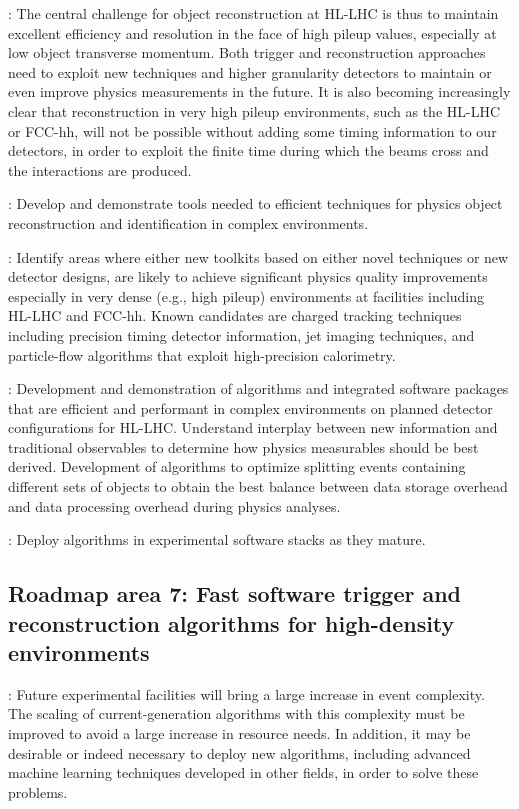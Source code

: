 : The central challenge for object reconstruction at HL-LHC is thus to maintain excellent efficiency and resolution in the face of high pileup values, especially at 
low object transverse momentum. Both trigger and reconstruction approaches need to exploit new techniques and higher granularity detectors to maintain or even improve physics measurements in the future.
It is also becoming increasingly clear that reconstruction in very high pileup environments, such as the HL-LHC or FCC-hh, will not be possible without adding some timing information to our 
detectors, in order to exploit the finite time during which the beams cross and the interactions are produced.

\vskip 0.5cm
: Develop and demonstrate tools needed to efficient techniques for physics object reconstruction and identification in complex environments.

\vskip 0.5cm
: Identify areas where either new toolkits based on either novel techniques or new detector designs, are likely to achieve significant physics quality 
improvements especially in very dense (e.g., high pileup) environments at facilities including HL-LHC and FCC-hh. Known candidates are charged tracking techniques including precision timing 
detector information, jet imaging techniques, and particle-flow algorithms that exploit high-precision calorimetry. 
 
\vskip 0.5cm
: Development and demonstration of algorithms and integrated software packages that are efficient and performant in complex environments on planned detector 
configurations for HL-LHC. Understand interplay between new information and traditional observables to determine how physics measurables should be best derived. Development of algorithms to 
optimize splitting events containing different sets of objects to obtain the best balance between data storage overhead and data processing overhead during physics analyses.

\vskip 0.5cm
: Deploy algorithms in experimental software stacks as they mature.

\subsection{Roadmap area 7: Fast software trigger and reconstruction algorithms for high-density environments}

: Future experimental facilities will bring a large increase in event complexity. The scaling of current-generation algorithms with this complexity must be improved 
to avoid a large increase in resource needs. In addition, it may be desirable or indeed necessary to deploy new algorithms, including advanced machine learning techniques developed in other fields, 
in order to solve these problems.


